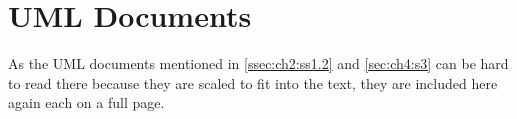 \chapter{UML Documents}
\label{chap:appendix:design_docs}
As the \gls{UML} documents mentioned in \cref{ssec:ch2:ss1.2} and \cref{sec:ch4:s3} can be hard to read there because they are scaled to fit into the text, they are included here again each on a full page.




